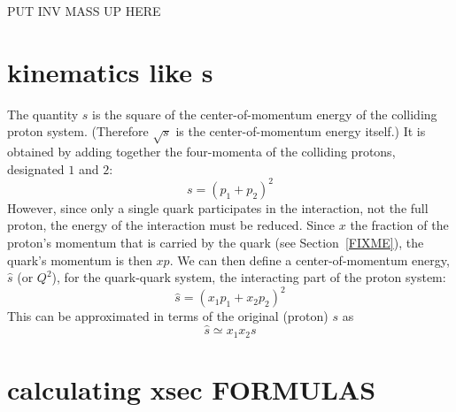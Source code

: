 PUT INV MASS UP HERE

\section{kinematics like s}
The quantity $s$ is the square of the center-of-momentum 
energy of the colliding proton system.  
(Therefore $\sqrt{s}$ is the center-of-momentum 
energy itself.)  
It is obtained by adding together the four-momenta 
of the colliding protons, designated $1$ and $2$: %
\[
s = (p_1 + p_2)^2
\]
However, since only a single quark participates 
in the interaction, not the full proton, 
the energy of the interaction must be reduced.  
Since $x$ the fraction of the proton's momentum that is carried 
by the quark (see Section~\ref{FIXME}), %
the 
quark's momentum is then $xp$.  
We can then define a center-of-momentum energy, 
$\hat{s}$ (or $Q^2$), 
for the quark-quark system, 
the interacting part of the proton system: 
\[
\hat{s} = (x_1 p_1 + x_2 p_2)^2
\]
This can be approximated in terms of the original 
(proton) $s$ as 
\[
\hat{s} \simeq x_1 x_2 s
\]




\section{calculating xsec FORMULAS}




